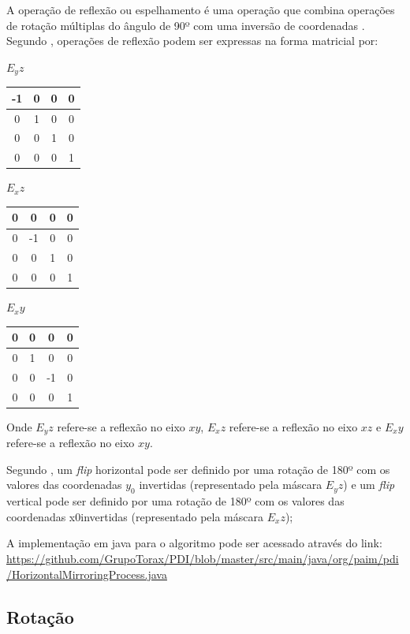 \documentclass[
	12pt,				%
	oneside,			%
	a4paper,			%
	english,			%
	french,				%
	spanish,			%
	brazil,				%
	]{abntex2}
\begin{document}
A operação de reflexão ou espelhamento é uma operação que combina operações de rotação múltiplas do ângulo de 90º com uma inversão de coordenadas \cite{conciAzevedoLeta:2008}. Segundo \citet{pedriniSchwartz:2008}, operações de reflexão podem ser expressas na forma matricial por:

\(E_yz\)
\begin{tabular}{|c|c|c|c|}
	\hline
    -1 & 0 & 0 & 0   \\ \hline
	 0 & 1 & 0 & 0   \\ \hline   
	 0 & 0 & 1 & 0   \\ \hline   
	 0 & 0 & 0 & 1   \\ \hline   
\end{tabular}
\(E_xz\)
\begin{tabular}{|c|c|c|c|}
	\hline
    0 &  0 & 0 & 0   \\ \hline
	0 & -1 & 0 & 0   \\ \hline   
	0 &  0 & 1 & 0   \\ \hline   
	0 &  0 & 0 & 1   \\ \hline   
\end{tabular}
\(E_xy\)
\begin{tabular}{|c|c|c|c|}
	\hline
    0 & 0 &  0 & 0   \\ \hline
	0 & 1 &  0 & 0   \\ \hline   
	0 & 0 & -1 & 0   \\ \hline   
	0 & 0 &  0 & 1   \\ \hline   
\end{tabular}

Onde \(E_yz\) refere-se a reflexão no eixo \(xy\), \(E_xz\) refere-se a reflexão no eixo \(xz\) e \(E_xy\) refere-se a reflexão no eixo \(xy\).

Segundo \citet{conciAzevedoLeta:2008}, um \textit{flip} horizontal pode ser definido por uma rotação de 180º com os valores das coordenadas \(y_0\) invertidas (representado pela máscara \(E_yz\)) e um \textit{flip} vertical pode ser definido por uma rotação de 180º com os valores das coordenadas x0invertidas (representado pela máscara \(E_xz\));

A implementação em java para o algoritmo pode ser acessado através do link:
\url{https://github.com/GrupoTorax/PDI/blob/master/src/main/java/org/paim/pdi/HorizontalMirroringProcess.java}

\subsection{Rotação}
\end{document}
